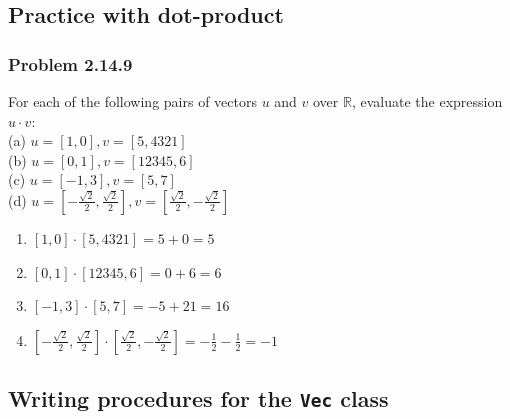 \documentclass[
  letterpaper,
  DIV=11,
  numbers=noendperiod]{scrartcl}
\providecommand{\tightlist}{%
  \setlength{\itemsep}{0pt}\setlength{\parskip}{0pt}}\usepackage{longtable,booktabs,array}
\begin{document}
\begin{figure}[H]

{\centering 

}

\end{figure}

\hypertarget{practice-with-dot-product}{%
\subsection{Practice with dot-product}\label{practice-with-dot-product}}

\hypertarget{problem-2.14.9}{%
\subsubsection{Problem 2.14.9}\label{problem-2.14.9}}

For each of the following pairs of vectors \(u\) and \(v\) over
\(\mathbb{R}\), evaluate the expression \(u \cdot v\):\\
(a) \(u = [1, 0], v = [5, 4321]\)\\
(b) \(u = [0, 1], v = [12345, 6]\)\\
(c) \(u = [-1, 3], v = [5, 7]\)\\
(d)
\(u = \left[-\frac{\sqrt{2}}{2}, \frac{\sqrt{2}}{2}\right], v = \left[\frac{\sqrt{2}}{2}, -\frac{\sqrt{2}}{2}\right]\)

\begin{enumerate}
\def\labelenumi{(\alph{enumi})}
\tightlist
\item
  \([1, 0] \cdot [5, 4321] = 5 + 0 = 5\)\\
\item
  \([0, 1] \cdot [12345, 6] = 0 + 6 = 6\)\\
\item
  \([-1, 3] \cdot [5, 7] = -5 + 21 =16\)\\
\item
  \(\left[-\frac{\sqrt{2}}{2}, \frac{\sqrt{2}}{2}\right] \cdot \left[\frac{\sqrt{2}}{2}, -\frac{\sqrt{2}}{2}\right] = -\frac{1}{2} - \frac{1}{2} = -1\)
\end{enumerate}

\hypertarget{writing-procedures-for-the-vec-class}{%
\subsection{\texorpdfstring{Writing procedures for the \texttt{Vec}
class}{Writing procedures for the Vec class}}\label{writing-procedures-for-the-vec-class}}
\end{document}
